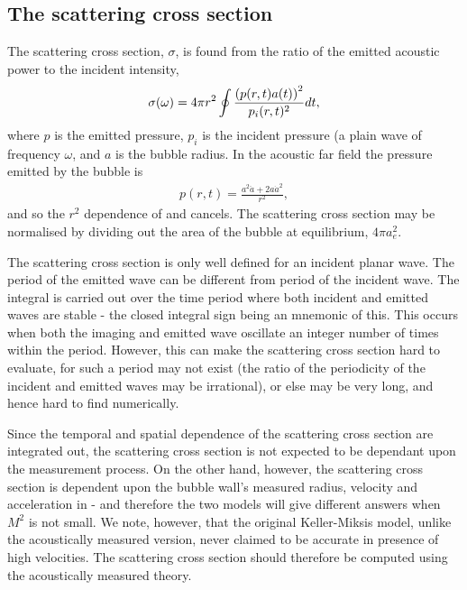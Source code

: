 \subsection{ The scattering cross section}\label{sec:measurement:scatteringxs}
The scattering cross section, $\sigma$, is found from the ratio of the  emitted acoustic power to the incident intensity, \cite{ShutilovBook}
\begin{align}
  \sigma(\omega) = 4\pi r^2 \oint \frac{ \left( p(r, t) a(t) \right)^2}{p_i(r,t)^2} dt,\label{eqn:sigmaff}
\end{align}
where $p$ is the emitted pressure, $p_i$ is the incident pressure (a plain wave of frequency $\omega$, and $a$ is the bubble radius.
In the acoustic far field the pressure emitted by the bubble\cite{Howe2003} is 
\begin{align}
p(r, t) =  \frac{a^2 \ddot a+  2a {\dot a}^2}{r^2}, \label{eqn:pff}
\end{align}
and so the $r^2$ dependence of  and  cancels.
The scattering cross section may be normalised by dividing out the area of the bubble at equilibrium, $4\pi a_e^2$.


The scattering cross section is only well defined for an incident planar wave.
The period of the emitted wave can be different from period of the incident wave.
The integral is carried out over the
time period where both incident and emitted waves are stable - the closed integral sign being an mnemonic of this.
This occurs when both the imaging and emitted wave oscillate an integer number of times within the period.
However, this can make the scattering cross section hard to evaluate, 
for such a period may not exist (the ratio of the periodicity of the incident and emitted waves may be irrational),
or else may be very long, and hence hard to find numerically.


Since the temporal and spatial dependence of the scattering cross section are integrated out,
the scattering cross section is not expected to be dependant upon the measurement process.
On the other hand, however,
the scattering cross section is dependent upon the bubble wall's measured radius, velocity and acceleration
in  -
and therefore the two models will give different answers when $M^2$ is not small.
We note, however, that the original Keller-Miksis model, unlike the acoustically measured version,
never claimed to be accurate in presence of high velocities.
The scattering cross section should therefore be computed using the acoustically measured theory.


